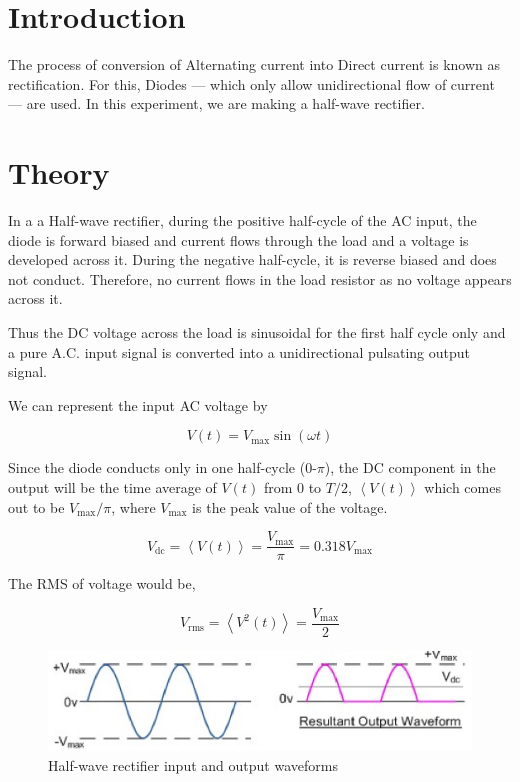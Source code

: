 \section{Introduction}

The process of conversion of Alternating current into Direct current is known as rectification. For this, Diodes --- which only allow unidirectional flow of current --- are used. In this experiment, we are making a half-wave rectifier.

\section{Theory}
In a a Half-wave rectifier, during the positive half-cycle of the AC input, the diode is forward biased and current flows through the load and a voltage is developed across it. During the negative half-cycle, it is reverse biased and does not conduct. Therefore, no current flows in the load resistor as no voltage appears across it.

Thus the DC voltage across the load is sinusoidal for the first half cycle only and a pure A.C. input signal is converted into a unidirectional pulsating output signal.

We can represent the input AC voltage by 

\begin{equation*}
    V(t) = V_\text{max}\sin(\omega t)   
\end{equation*}

Since the diode conducts only in one half-cycle (0-$\pi$), the DC component in the output will be the time average of $V(t)$ from $0$ to $T/2$, $\left<V(t)\right>$ which comes out to be $V_\text{max}/\pi$, where $V_\text{max}$ is the peak value of the voltage.

\begin{equation}
    V_{\text{dc}} = \left<V(t)\right> = \frac{V_{\text{max}}}{\pi} = 0.318V_\text{max}
\end{equation}

The RMS of voltage would be,

\begin{equation}
    V_{\text{rms}} = \left<V^2(t)\right> = \frac{V_{\text{max}}}{2}
\end{equation}

\begin{figure}[H]
    \centering
    \includegraphics[width=1\columnwidth]{images/f1.png}
    \caption{Half-wave rectifier input and output waveforms}
\end{figure}


